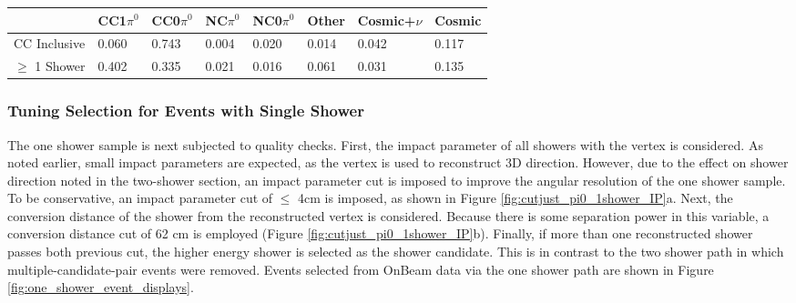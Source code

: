 \begin{table}[H]
\centering
{}
 \begin{tabular}{| l | l | l |l|l|l|l|l|}
 \hline
 & CC1$\pi^0$ & CC0$\pi^0$ & NC$\pi^0$ & NC0$\pi^0$ & Other & Cosmic+$\nu$& Cosmic\\ [0.1ex] \hline
CC Inclusive & 0.060 & 0.743 & 0.004 & 0.020 & 0.014 & 0.042 & 0.117 \\
$\geq$ 1 Shower & 0.402 & 0.335 & 0.021 & 0.016 & 0.061 & 0.031 & 0.135\\ \hline
\end{tabular}
\end{table}

\subsubsection{Tuning Selection for Events with Single Shower}

The one shower sample is next subjected to quality checks. First, the impact parameter of all showers with the vertex is considered.  As noted earlier, small impact parameters are expected, as the vertex is used to reconstruct 3D direction. However, due to the effect on shower direction noted in the two-shower section, an impact parameter cut is imposed to improve the angular resolution of the one shower sample. To be conservative, an impact parameter cut of $\leq$ 4cm is imposed, as shown in Figure \ref{fig:cutjust_pi0_1shower_IP}a.   Next, the conversion distance of the shower from the reconstructed vertex is considered. Because there is some separation power in this variable, a conversion distance cut of 62 cm is employed (Figure \ref{fig:cutjust_pi0_1shower_IP}b).  Finally, if more than one reconstructed shower passes both previous cut, the higher energy shower is selected as the shower candidate. This is in contrast to the two shower path in which multiple-candidate-pair events were removed.  Events selected from OnBeam data via the one shower path are shown in Figure \ref{fig:one_shower_event_displays}. 


